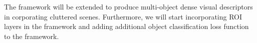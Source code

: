 The framework will be extended to produce multi-object dense visual descriptors in corporating cluttered scenes.
Furthermore, we will start incorporating ROI layers in the framework and adding additional object classification loss function to the framework.

